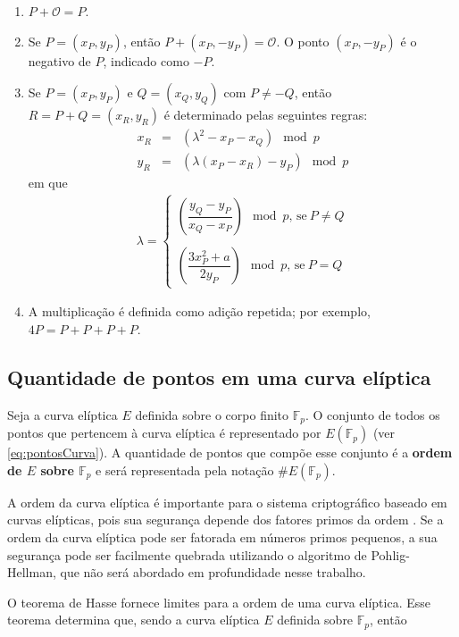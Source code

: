 \begin{enumerate}
  \item $P + \mathcal{O} = P$.
  \item Se $P = (x_P, y_P)$, então $P + (x_P, -y_P) = \mathcal{O}$. O ponto $(x_P, -y_P)$ é o negativo de \(P\), indicado como \(-P\).
  \item Se $P = (x_P, y_P)$ e $Q = (x_Q, y_Q)$ com $P \neq -Q$, então $R = P + Q = (x_R, y_R)$ é determinado pelas seguintes regras:
    \begin{eqnarray*}
    x_R &=& (\lambda^2 - x_P - x_Q) \mod p \\
    y_R &=& (\lambda(x_P - x_R) - y_P) \mod p
    \end{eqnarray*}
  em que
    \begin{eqnarray*}
    \lambda =
    \begin{cases}
    \left(\dfrac{y_Q - y_P}{x_Q - x_P}\right) \mod p \textrm{, se} \ P \neq Q \\ \\
    \left(\dfrac{3x_P^2 + a}{2y_P}\right) \mod p \textrm{, se} \ P = Q
    \end{cases}
    \end{eqnarray*}
  \item A multiplicação é definida como adição repetida; por exemplo, $4P = P + P + P + P$.
\end{enumerate}

%
%
\subsection{Quantidade de pontos em uma curva elíptica}
Seja a curva elíptica $E$ definida sobre o corpo finito $\mathbb{F}_p$. O conjunto de todos os pontos que pertencem à curva elíptica é representado por $E(\mathbb{F}_p)$ (ver \ref{eq:pontosCurva}). A quantidade de pontos que compõe esse conjunto é a \textbf{ordem de $E$ sobre $\mathbb{F}_p$} e será representada pela notação $\#E(\mathbb{F}_p)$. \cite{Guide}

A ordem da curva elíptica é importante para o sistema criptográfico baseado em curvas elípticas, pois sua segurança depende dos fatores primos da ordem \cite{Alvarado:2005}. Se a ordem da curva elíptica pode ser fatorada em números primos pequenos, a sua segurança pode ser facilmente quebrada utilizando o algoritmo de Pohlig-Hellman, que não será abordado em profundidade nesse trabalho.

O teorema de Hasse fornece limites para a ordem de uma curva elíptica. Esse teorema determina que, sendo a curva elíptica $E$ definida sobre $\mathbb{F}_p$, então

